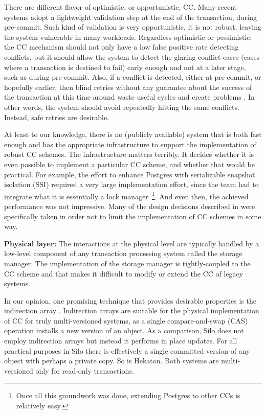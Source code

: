 There are different flavor of optimistic, or opportunistic, CC. Many recent systems adopt a lightweight validation step at the end of the transaction, during pre-commit. Such kind of validation is very opportunistic, it is not robust, leaving the system vulnerable in many workloads.
Regardless optimistic or pessimistic, the CC mechanism should not only have a low false positive rate detecting conflicts, but it should allow the system to detect the glaring conflict cases (cases where a transaction is destined to fail) early enough and not at a later stage, such as during pre-commit.
Also, if a conflict is detected, either at pre-commit, or hopefully earlier, then blind retries without any guarantee about the success of the transaction at this time around waste useful cycles and create problems \cite{PortsG12}. In other words, the system should avoid repeatedly hitting the same conflicts. Instead, safe retries are desirable. 

At least to our knowledge, there is no (publicly available) system that is both fast enough and has the appropriate infrastructure to support the implementation of robust CC schemes. The infrastructure matters terribly. It decides whether it is even possible to implement a particular CC scheme, and whether that would be practical. For example, the effort to enhance Postgres with serializable snapshot isolation (SSI) required a very large implementation effort, since the team had to integrate what it is essentially a lock manager~\footnote{Once all this groundwork was done, extending Postgres to other CCs is relatively easy.}. And even then, the achieved performance was not impressive.  Many of the design decisions described in  were specifically taken in order not to limit the implementation of CC schemes in some way.

\vspace{2mm}
{\bf Physical layer:} 
The interactions at the physical level are typically handled by a low-level component of any transaction processing system called the storage manager.
The implementation of the storage manager is tightly-coupled to the CC scheme and that makes it difficult to modify or extend the CC of legacy systems.  

In our opinion, one promising technique that provides desirable properties is the indirection array \cite{SadoghiRCB13,Diaconu+13}.
Indirection arrays are suitable for the physical implementation of CC for truly multi-versioned systems, as a single compare-and-swap (CAS) operation installs a new version of an object. 
As a comparison, Silo does not employ indirection arrays but instead it performs in place updates. For all practical purposes in Silo there is effectively a single committed version of any object with perhaps a private copy. So is Hekaton. Both systems are multi-versioned only for read-only transactions.

